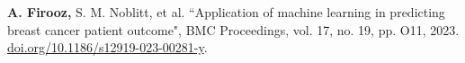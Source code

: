 \begin{cvpublication}
{\begin{cvitems}
        \end{cvitems}}
        {}
    \cvpub
        {\begin{cvitems}
            \item {\textbf{A. Firooz,} S. M. Noblitt, et al. “Application of machine learning in predicting breast cancer patient outcome", BMC Proceedings, vol. 17, no. 19, pp. O11, 2023. \href{https://doi.org/10.1186/s12919-023-00281-y}{doi.org/10.1186/s12919-023-00281-y}.}
        \end{cvitems}}
    {}
\end{cvpublication}
